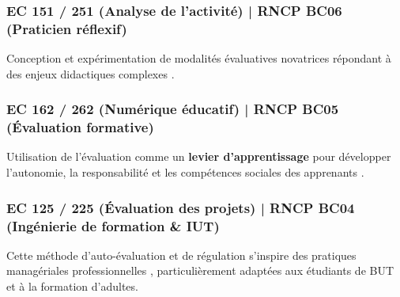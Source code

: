 \subsubsection{EC 151 / 251 (Analyse de l'activité) | RNCP BC06 (Praticien réflexif)}

Conception et expérimentation de modalités évaluatives novatrices répondant à des enjeux didactiques complexes \parencite{schon_reflective_practitioner,perrenoud_pratique_reflexive,recherche_action_education}.

\subsubsection{EC 162 / 262 (Numérique éducatif) | RNCP BC05 (Évaluation formative)}

Utilisation de l'évaluation comme un \textbf{levier d'apprentissage} pour développer l'autonomie, la responsabilité et les compétences sociales des apprenants \parencite{evaluation_formative}.

\subsubsection{EC 125 / 225 (Évaluation des projets) | RNCP BC04 (Ingénierie de formation \& IUT)}

Cette méthode d'auto-évaluation et de régulation s'inspire des pratiques managériales professionnelles \parencite{competences_transversales_eurecia}, particulièrement adaptées aux étudiants de BUT et à la formation d'adultes.
